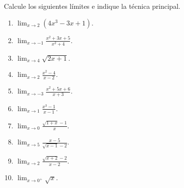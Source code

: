 \documentclass[10pt,a5paper]{article}
\newif\ifmostrarSoluciones
\begin{document}
\begin{ejercicios}
Calcule los siguientes límites e indique la técnica principal.
\begin{enumerate}
  \item $\displaystyle\lim_{x\to2}(4x^3-3x+1)$.
  \item $\displaystyle\lim_{x\to-1}\frac{x^2+3x+5}{x^2+4}$.
  \item $\displaystyle\lim_{x\to4}\sqrt{2x+1}$.
  \item $\displaystyle\lim_{x\to2}\frac{x^2-4}{x-2}$.
  \item $\displaystyle\lim_{x\to-3}\frac{x^2+5x+6}{x+3}$.
  \item $\displaystyle\lim_{x\to1}\frac{x^3-1}{x-1}$.
  \item $\displaystyle\lim_{x\to0}\frac{\sqrt{1+x}-1}{x}$.
  \item $\displaystyle\lim_{x\to5}\frac{x-5}{\sqrt{x-1}-2}$.
  \item $\displaystyle\lim_{x\to2}\frac{\sqrt{x+2}-2}{x-2}$.
  \item $\displaystyle\lim_{x\to0^+}\sqrt{x}$.
\end{enumerate}
\end{ejercicios}

\ifmostrarSoluciones
\begin{solucion}[de los ejercicios]
\begin{enumerate}
  \item $27$, por sustitución directa.
  \item $3/5$, por sustitución directa.
  \item $3$, por sustitución directa.
  \item $4$, pues $(x^2-4)/(x-2)=x+2$ para $x\neq2$.
  \item $-1$, pues $(x+2)(x+3)/(x+3)=x+2$ para $x\neq-3$.
  \item $3$, usando $x^3-1=(x-1)(x^2+x+1)$.
  \item $1/2$, al racionalizar el numerador.
  \item $4$, porque el cociente se simplifica a $\sqrt{x-1}+2$.
  \item $1/4$, al racionalizar el numerador.
  \item $0$; solo se considera la aproximación por la derecha.
\end{enumerate}
\end{solucion}
\fi

\end{document}
